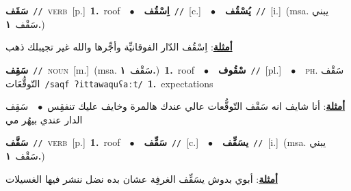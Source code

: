 \documentclass[10pt,a4paper,twoside]{article} %
\begin{document}
\begin{multicols}{2}
{\setlength\topsep{0pt}\textbf{\foreignlanguage{arabic}{سَقَف}}\ {\color{gray}\texttt{//}\color{black}}\ \textsc{verb}\ [p.]\ \textbf{1.}~roof\ \ $\bullet$\ \ \setlength\topsep{0pt}\textbf{\foreignlanguage{arabic}{اِسْقُف}}\ {\color{gray}\texttt{//}\color{black}}\ [c.]\ \ $\bullet$\ \ \setlength\topsep{0pt}\textbf{\foreignlanguage{arabic}{يُسْقُف}}\ {\color{gray}\texttt{//}\color{black}}\ [i.]\ \color{gray}(msa. \foreignlanguage{arabic}{يبني سَقْف}~\foreignlanguage{arabic}{\textbf{١.}})\color{black}\  \begin{flushright}\color{gray}\foreignlanguage{arabic}{\textbf{\underline{\foreignlanguage{arabic}{أمثلة}}}: اِسْقُف الدّار الفوقانيِّة وأجِّرها والله غير تجيبلك ذهب}\end{flushright}\color{black}} \vspace{2mm}

{\setlength\topsep{0pt}\textbf{\foreignlanguage{arabic}{سَقِف}}\ {\color{gray}\texttt{//}\color{black}}\ \textsc{noun}\ [m.]\ \color{gray}(msa. \foreignlanguage{arabic}{سَقْف}~\foreignlanguage{arabic}{\textbf{١.}})\color{black}\ \textbf{1.}~roof\ \ $\bullet$\ \ \setlength\topsep{0pt}\textbf{\foreignlanguage{arabic}{سْقُوف}}\ {\color{gray}\texttt{//}\color{black}}\ [pl.]\ \ $\bullet$\ \ \textsc{ph.} \color{gray} \foreignlanguage{arabic}{سَقْف التّوقُّعَات}\color{black}\ {\color{gray}\texttt{/{\sffamily saqf ʔittawaquʕaːt}/}\color{black}}\ \textbf{1.}~expectations\  \begin{flushright}\color{gray}\foreignlanguage{arabic}{\textbf{\underline{\foreignlanguage{arabic}{أمثلة}}}: أنا شايف انه سَقْف التّوقُّعات عالي عندك هالمرة وخايف عليك تنفقِس\ $\bullet$\ \  سَقِف الدار عندي بيهُر مي}\end{flushright}\color{black}} \vspace{2mm}

{\setlength\topsep{0pt}\textbf{\foreignlanguage{arabic}{سَقَّف}}\ {\color{gray}\texttt{//}\color{black}}\ \textsc{verb}\ [p.]\ \textbf{1.}~roof\ \ $\bullet$\ \ \setlength\topsep{0pt}\textbf{\foreignlanguage{arabic}{سَقِّف}}\ {\color{gray}\texttt{//}\color{black}}\ [c.]\ \ $\bullet$\ \ \setlength\topsep{0pt}\textbf{\foreignlanguage{arabic}{يسَقِّف}}\ {\color{gray}\texttt{//}\color{black}}\ [i.]\ \color{gray}(msa. \foreignlanguage{arabic}{يبني سَقْف}~\foreignlanguage{arabic}{\textbf{١.}})\color{black}\  \begin{flushright}\color{gray}\foreignlanguage{arabic}{\textbf{\underline{\foreignlanguage{arabic}{أمثلة}}}: أبوي بدوش يسَقِّف الغرفِة عشان بده نضل ننشر فيها الغسيلات}\end{flushright}\color{black}} \vspace{2mm}


\end{multicols}
\end{document}
